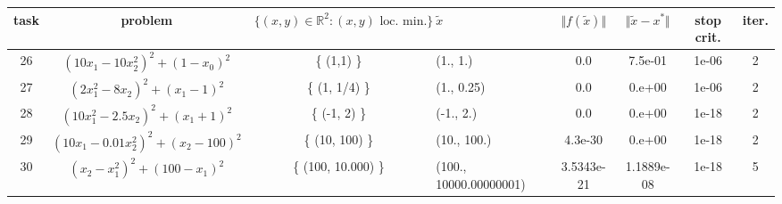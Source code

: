 \documentclass[12pt, a4paper, parskip=half]{scrartcl}
\begin{document}
\begin{enumerate}[leftmargin=0.5cm, label=(\roman*)]
        \begin{table}[!ht]
            \begin{adjustbox}{angle=90}
                \begin{tabular}{|| c | c | c | p{2cm} | c | c | c | c ||} 
                    \hline
                    task & problem & \footnotesize $\{ (x, y) \in \mathbb{R}^2 : (x, y) \text{ loc. min.}\}$ & $\tilde{x}$ & $\Vert f(\tilde{x}) \Vert$ & $\Vert \tilde{x} - x^* \Vert$ & \tiny stop crit. & iter. \\ [0.5ex] 
                    \hline\hline
                    26 & \footnotesize $(10 x_1 - 10x_2^2)^2 + (1 - x_0)^2$ & \{ (1,1) \} & \footnotesize (1., 1.) & 0.0 & 7.5e-01 & 1e-06 & 2 \\
                    \hline
                    27 & \footnotesize $(2x_1^2 - 8x_2)^2 + (x_1 - 1)^2$ & \{ (1, 1/4) \} & \footnotesize (1., 0.25) & 0.0 & 0.e+00 & 1e-06 & 2 \\
                    \hline
                    28 & $(10x_1^2 - 2.5x_2)^2 + (x_1 + 1)^2$ & \{ (-1, 2) \} & \footnotesize (-1., 2.) & 0.0 & 0.e+00 & 1e-18 & 2 \\
                    \hline
                    29 & $(10x_1 - 0.01x_2^2)^2 + (x_2 - 100)^2$ & \{ (10, 100) \} & \footnotesize (10., 100.) & 4.3e-30 & 0.e+00 & 1e-18 & 2 \\
                    \hline
                    30 & $(x_2 - x_1^2)^2 + (100 - x_1)^2$ & \{ (100, 10.000) \} & \scriptsize (100., 10000.00000001) & \scriptsize 3.5343e-21 & \scriptsize 1.1889e-08 & 1e-18 & 5 \\ [1ex] 
                    \hline
                \end{tabular}
            \end{adjustbox}
        \end{table}

    \end{enumerate}
\end{document}
